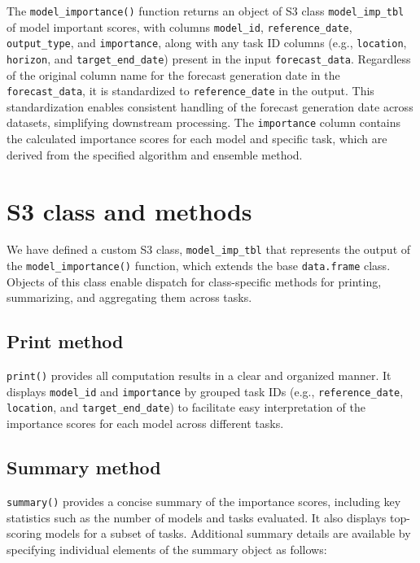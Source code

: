 \documentclass[
  article,
  shortnames,
  notitle]{jss}
\begin{document}
The \texttt{model\_importance()} function returns an object of S3 class
\texttt{model\_imp\_tbl} of model important scores, with columns
\texttt{model\_id}, \texttt{reference\_date}, \texttt{output\_type}, and
\texttt{importance}, along with any task ID columns (e.g.,
\texttt{location}, \texttt{horizon}, and \texttt{target\_end\_date})
present in the input \texttt{forecast\_data}. Regardless of the original
column name for the forecast generation date in the
\texttt{forecast\_data}, it is standardized to \texttt{reference\_date}
in the output. This standardization enables consistent handling of the
forecast generation date across datasets, simplifying downstream
processing. The \texttt{importance} column contains the calculated
importance scores for each model and specific task, which are derived
from the specified algorithm and ensemble method.

\section{S3 class and methods}\label{sec:s3-infrastructure}

We have defined a custom S3 class, \texttt{model\_imp\_tbl} that
represents the output of the \texttt{model\_importance()} function,
which extends the base \texttt{data.frame} class. Objects of this class
enable dispatch for class-specific methods for printing, summarizing,
and aggregating them across tasks.

\subsection{Print method}\label{print-method}

\texttt{print()} provides all computation results in a clear and
organized manner. It displays \texttt{model\_id} and \texttt{importance}
by grouped task IDs (e.g., \texttt{reference\_date}, \texttt{location},
and \texttt{target\_end\_date}) to facilitate easy interpretation of the
importance scores for each model across different tasks.

\subsection{Summary method}\label{summary-method}

\texttt{summary()} provides a concise summary of the importance scores,
including key statistics such as the number of models and tasks
evaluated. It also displays top-scoring models for a subset of tasks.
Additional summary details are available by specifying individual
elements of the summary object as follows:
\end{document}
